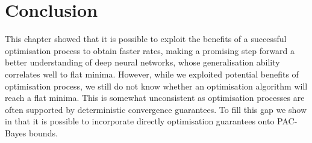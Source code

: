 \section{Conclusion}

This chapter showed that it is possible to exploit the benefits of a successful optimisation process to obtain faster rates, making a promising step forward a better understanding of deep neural networks, whose generalisation ability correlates well to flat minima. However, while we exploited potential benefits of optimisation process, we still do not know whether an optimisation algorithm will reach a flat minima. This is somewhat unconsistent as optimisation processes are often supported by deterministic convergence guarantees. To fill this gap we show in  that it is possible to incorporate directly optimisation guarantees onto PAC-Bayes bounds.
